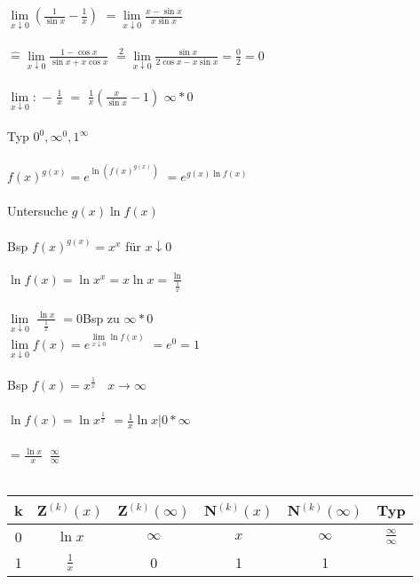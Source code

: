 \documentclass[18pt,a4paper]{article}
\begin{document}
$ \underset{x \downarrow 0} {\lim} ${\large $\left( \frac{1}{\sin x} - \frac{1}{x} \right)$ } $ = \underset{x \downarrow 0} {\lim} ${\large $\frac{x - \sin x}{x \sin x}$ } \\\\ $
\mathrel{\hat=} \underset{x \downarrow 0} {\lim} ${\large $\frac {1 - \cos x}{\sin x + x \cos x} $ } $ \overset {2} {=} \underset {x \downarrow 0} {\lim} ${\large $\frac{\sin x}{ 2 \cos x - x \sin x} = \frac{0}{2} = 0 $} \\\\ $
\underset {x \downarrow 0} {\lim} : $ $- $ {\large $ \frac{1}{x} $ } $ = $ {\large $\frac{1}{x} \left(\frac{x}{\sin x} - 1 \right) $ } $ \infty * 0 $ \\\\
Typ $ 0^0 , \infty^0 , 1^\infty $ \\\\ $
f (x)^{g(x)} = ${\large $ e^{\ln \left(f(x)^{g(x)}\right)} $ } $ = ${\large $e^{g(x) \ln f(x)} $ } \\\\ 
Untersuche  $ g(x) \ln f(x) $ \\\\ Bsp $
f(x)^{g(x)} = x^x $ \quad für $ x \downarrow 0 $ \\\\ $
\ln f(x) =  \ln x^x =  x \ln x =${\large $ \frac{\ln}{\frac{1}{x}} $ } \\\\ $ \underset { x \downarrow 0} {\lim} $ {\large $\frac{\ln x}{\frac{1}{x}} $ } $ = 0 $\quad Bsp zu $ \infty * 0 $ \\ $
\underset { x \downarrow 0} {\lim} f (x) = ${\large $e^{\underset {x \downarrow 0}{\lim}\ln f(x)} $ } $ = e^0 = 1 $ \\\\ Bsp $
f(x) = ${\large $x^{\frac{1}{x}} $ } $ \> $ \qquad $  x \rightarrow \infty $ \\\\ $
\ln f(x) = ${\large $\ln x^{\frac{1}{x}} $ } $= \frac{1}{x} \ln x \vert 0 * \infty $ \\\\ $
= ${\large $\frac{\ln x}{x}  \> $ \qquad $   \frac{\infty}{\infty} $ } \\\\

\begin{tabular}{ |c|c|c|c|c|c| } 
 \hline
 k & Z$^{(k)}(x)$ & Z$^{(k)}(\infty)$ & N$^{(k)}(x)$ & N$^{(k)}(\infty)$ & Typ \\ 
 \hline
 0 & $\ln x$ & $\infty$ & $x$ & $\infty$ & $\frac{\infty}{\infty}$ \\ 
 1 & $\frac{1}{x}$ & 0 & 1 & 1 & \\ 
 \hline
\end{tabular}



\end{document}
